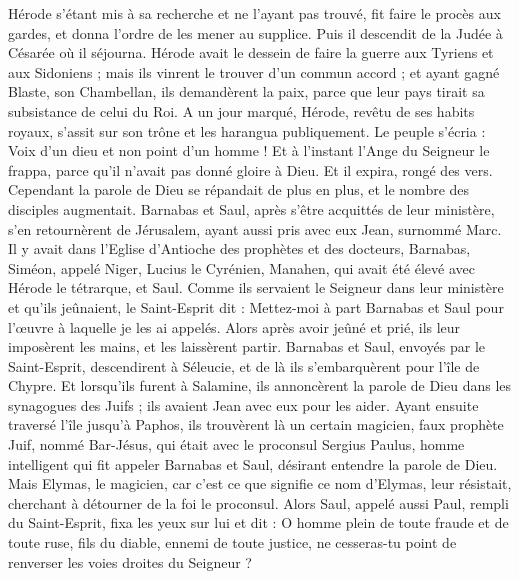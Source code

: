 \begin{multicols}{2}
Hérode s’étant mis à sa recherche et ne l’ayant pas trouvé, fit faire le procès aux gardes, et donna l’ordre de les mener au supplice. Puis il descendit de la Judée à Césarée où il séjourna.
Hérode avait le dessein de faire la guerre aux Tyriens et aux Sidoniens ; mais ils vinrent le trouver d'un commun accord ; et ayant gagné Blaste, son Chambellan, ils demandèrent la paix, parce que leur pays tirait sa subsistance de celui du Roi.
A un jour marqué, Hérode, revêtu de ses habits royaux, s'assit sur son trône et les harangua publiquement.
Le peuple s'écria : Voix d'un dieu et non point d'un homme !
Et à l'instant l’Ange du Seigneur le frappa, parce qu'il n'avait pas donné gloire à Dieu. Et il expira, rongé des vers.
Cependant la parole de Dieu se répandait de plus en plus, et le nombre des disciples augmentait.
Barnabas et Saul, après s’être acquittés de leur ministère, s’en retournèrent de Jérusalem, ayant aussi pris avec eux Jean, surnommé Marc.
\VerseOne{}Il y avait dans l'Eglise d’Antioche des prophètes et des docteurs, Barnabas, Siméon, appelé Niger, Lucius le Cyrénien, Manahen, qui avait été élevé avec Hérode le tétrarque, et Saul.
Comme ils servaient le Seigneur dans leur ministère et qu'ils jeûnaient, le Saint-Esprit dit : Mettez-moi à part Barnabas et Saul pour l’œuvre à laquelle je les ai appelés.
Alors après avoir jeûné et prié, ils leur imposèrent les mains, et les laissèrent partir.
Barnabas et Saul, envoyés par le Saint-Esprit, descendirent à Séleucie, et de là ils s’embarquèrent pour l’île de Chypre.
Et lorsqu’ils furent à Salamine, ils annoncèrent la parole de Dieu dans les synagogues des Juifs ; ils avaient Jean avec eux pour les aider.
Ayant ensuite traversé l'île jusqu'à Paphos, ils trouvèrent là un certain magicien, faux prophète Juif, nommé Bar-Jésus,
qui était avec le proconsul Sergius Paulus, homme intelligent qui fit appeler Barnabas et Saul, désirant entendre la parole de Dieu.
Mais Elymas, le magicien, car c'est ce que signifie ce nom d'Elymas, leur résistait, cherchant à détourner de la foi le proconsul.
Alors Saul, appelé aussi Paul, rempli du Saint-Esprit, fixa les yeux sur lui et dit :
O homme plein de toute fraude et de toute ruse, fils du diable, ennemi de toute justice, ne cesseras-tu point de renverser les voies droites du Seigneur ?

\end{multicols}
